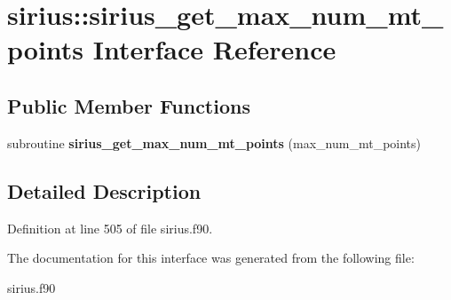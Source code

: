 \hypertarget{interfacesirius_1_1sirius__get__max__num__mt__points}{}\section{sirius\+:\+:sirius\+\_\+get\+\_\+max\+\_\+num\+\_\+mt\+\_\+points Interface Reference}
\label{interfacesirius_1_1sirius__get__max__num__mt__points}
\subsection*{Public Member Functions}
\begin{DoxyCompactItemize}
\item 
\hypertarget{interfacesirius_1_1sirius__get__max__num__mt__points_a64af3d0aaeac47da7584f3db8e32ad9b}{}subroutine {\bfseries sirius\+\_\+get\+\_\+max\+\_\+num\+\_\+mt\+\_\+points} (max\+\_\+num\+\_\+mt\+\_\+points)\label{interfacesirius_1_1sirius__get__max__num__mt__points_a64af3d0aaeac47da7584f3db8e32ad9b}

\end{DoxyCompactItemize}


\subsection{Detailed Description}


Definition at line 505 of file sirius.\+f90.



The documentation for this interface was generated from the following file\+:\begin{DoxyCompactItemize}
\item 
sirius.\+f90\end{DoxyCompactItemize}
